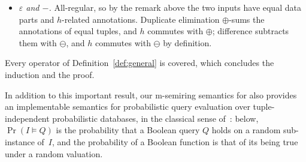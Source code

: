 \begin{appendixproof}
\begin{itemize}
  of the two annotations and concatenates their pending factors, so the
  denoted annotations are multiplied, and $h$ commutes with $\otimes$;
  the union is the multiset sum of the two results and combines no
  annotation at all.
\item \emph{$\varepsilon$ and $-$.} All-regular, so by the remark above
  the two inputs have equal data parts and $h$-related annotations.
  Duplicate elimination $\oplus$-sums the annotations of equal tuples,
  and $h$ commutes with $\oplus$; difference subtracts them with
  $\ominus$, and $h$ commutes with $\ominus$ by definition.
\end{itemize}
Every operator of Definition~\ref{def:general} is covered, which
concludes the induction and the proof.
\end{appendixproof}

In addition to this important result, our m-semiring semantics
for  also provides an implementable semantics for probabilistic query
evaluation over tuple-independent probabilistic databases, in the classical
sense of~\cite{suciu2011probabilistic}: below, $\Pr(I\models Q)$ is the probability
that a Boolean query $Q$ holds on a random sub-instance of~$I$, and the
probability of a Boolean function is that of its being true under a random
valuation.

